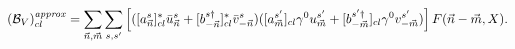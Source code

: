 \begin{equation}
\label{fermionnumberVaprox}
({\cal B}_V)^{\it{approx}}_{cl} = \sum_{{\vec n},{\vec m}} 
\sum_{s,s'} 
\left[([a^{s}_{\vec n}]^*_{cl} \bar{u}^s_{\vec n} +
[b^{s\dagger}_{-{\vec n}}]^*_{cl} \bar{v}^s_{-{\vec n}})
([a^{s'}_{\vec m}]_{cl}\gamma^0 u^{s'}_{\vec m} +
[b^{s'\dagger}_{-{\vec m}}]_{cl}\gamma^0 v^{s'}_{-{\vec m}})\right]
F({\vec n}-{\vec m},X).
\end{equation}

